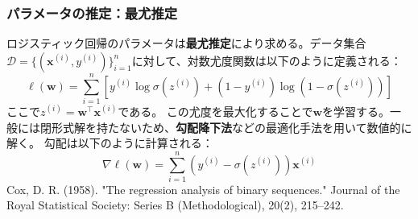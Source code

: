 \subsubsection{パラメータの推定：最尤推定}
ロジスティック回帰のパラメータは\textbf{最尤推定}により求める。データ集合$\mathcal{D} = \{(\mathbf{x}^{(i)}, y^{(i)})\}_{i=1}^n$に対して、対数尤度関数は以下のように定義される：
\begin{equation}
\ell(\mathbf{w}) = \sum_{i=1}^n \left[ y^{(i)} \log \sigma(z^{(i)}) + (1 - y^{(i)}) \log (1 - \sigma(z^{(i)})) \right]
\end{equation}
ここで$z^{(i)} = \mathbf{w}^\top \mathbf{x}^{(i)}$である。
この尤度を最大化することで$\mathbf{w}$を学習する。一般には閉形式解を持たないため、\textbf{勾配降下法}などの最適化手法を用いて数値的に解く。
勾配は以下のように計算される：
\begin{equation}
\nabla \ell(\mathbf{w}) = \sum_{i=1}^n (y^{(i)} - \sigma(z^{(i)})) \mathbf{x}^{(i)}
\end{equation}
Cox, D. R. (1958). "The regression analysis of binary sequences." Journal of the Royal Statistical Society: Series B (Methodological), 20(2), 215–242.
